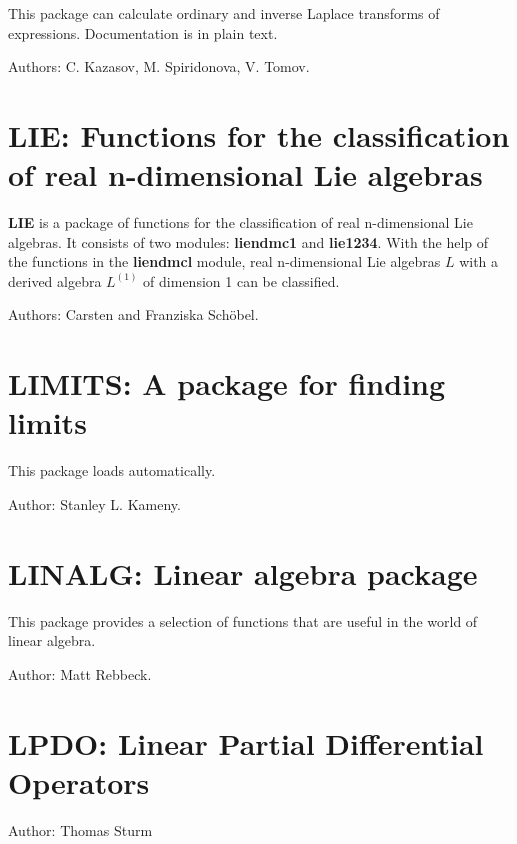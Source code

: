 This package can calculate ordinary and inverse Laplace transforms of
expressions.  Documentation is in plain text.

Authors: C. Kazasov, M. Spiridonova, V. Tomov.


\newpage

\section{LIE: Functions for the classification of real n-dimensional Lie
algebras}

{\bf LIE} is a package of functions for the classification of real
n-dimensional Lie algebras.  It consists of two modules: {\bf liendmc1}
and {\bf lie1234}.  With the help of the functions in the {\bf liendmcl}
module, real n-dimensional Lie algebras $L$ with a derived algebra
$L^{(1)}$ of dimension 1 can be classified.

Authors: Carsten and Franziska Sch\"obel.


\newpage

\section{LIMITS: A package for finding limits} 


This package loads automatically.

Author: Stanley L. Kameny.


\newpage

\section{LINALG: Linear algebra package} 
\label{LINALG}

This package provides a selection of functions that are useful 
in the world of linear algebra.

Author: Matt Rebbeck.


\newpage

\section{LPDO: Linear Partial Differential Operators}
\label{LPDO}

Author: Thomas Sturm

